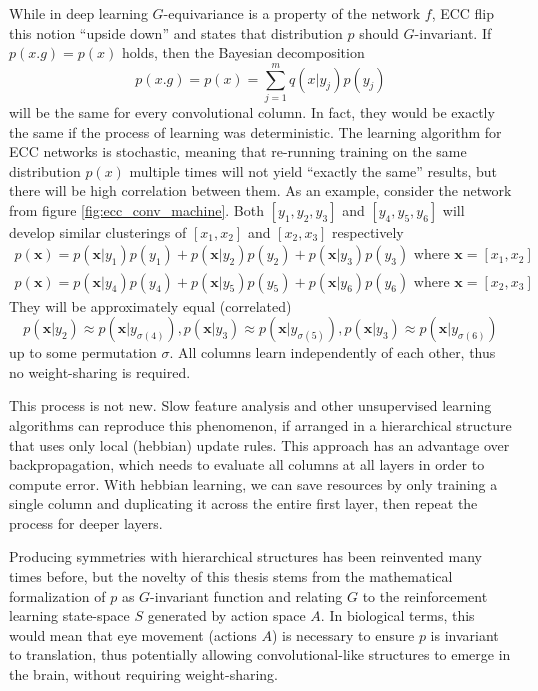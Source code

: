 \documentclass[12pt]{article}
\begin{document}
While in deep learning $G$-equivariance is a property of the network $f$, ECC flip this notion ``upside down'' and states that distribution $p$ should $G$-invariant. If $p(x.g)=p(x)$ holds, then the Bayesian decomposition
\[
p(x.g) = p(x) = \sum_{j=1}^m q(x|y_j)p(y_j)  
\]
will be the same for every convolutional column. In fact, they would be exactly the same if the process of learning was deterministic. The learning algorithm for ECC networks is stochastic, meaning that re-running training on the same distribution $p(x)$ multiple times will not yield ``exactly the same'' results, but there will be high correlation between them.
As an example, consider the network from figure \ref{fig:ecc_conv_machine}. Both $[y_1,y_2,y_3]$ and $[y_4,y_5,y_6]$ will develop similar clusterings of $[x_1,x_2]$ and $[x_2,x_3]$ respectively
\begin{gather*}
	p(\boldsymbol{x}) = p(\boldsymbol{x}|y_1)p(y_1)+  p(\boldsymbol{x}|y_2)p(y_2)+  p(\boldsymbol{x}|y_3)p(y_3)\text{ where }\boldsymbol{x}=[x_1,x_2] \\
	p(\boldsymbol{x}) = p(\boldsymbol{x}|y_4)p(y_4)+  p(\boldsymbol{x}|y_5)p(y_5)+  p(\boldsymbol{x}|y_6)p(y_6)\text{ where }\boldsymbol{x}=[x_2,x_3]
\end{gather*}
They will be approximately equal  (correlated)
\[p(\boldsymbol{x}|y_2) \approx p(\boldsymbol{x}|y_{\sigma(4)}), p(\boldsymbol{x}|y_{3}) \approx p(\boldsymbol{x}|y_{\sigma(5)}),p(\boldsymbol{x}|y_3) \approx p(\boldsymbol{x}|y_{\sigma(6)})\]
up to some permutation $\sigma$. All columns learn independently of each other, thus no weight-sharing is required.

This process is not new. Slow feature analysis and other unsupervised learning algorithms can reproduce this phenomenon, if arranged in a hierarchical structure that uses only local (hebbian) update rules. This approach has an advantage over backpropagation, which needs to evaluate all columns at all layers in order to compute error. With hebbian learning, we can save resources by only training a single column and  duplicating it across the entire first layer, then repeat the process for deeper layers.

Producing symmetries with hierarchical structures has been reinvented many times before, but the novelty of this thesis stems from the mathematical formalization of $p$ as $G$-invariant function and relating $G$ to the reinforcement learning state-space $S$ generated by action space $A$. In biological terms, this would mean that eye movement (actions $A$) is necessary to ensure $p$ is invariant to translation, thus potentially allowing convolutional-like structures to emerge in the brain, without requiring weight-sharing.
\end{document}
